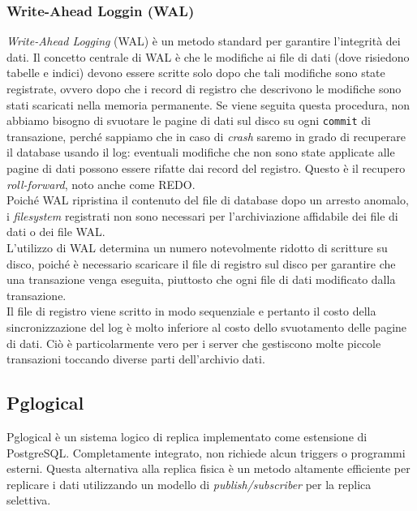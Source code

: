 \item
\subsubsection{Write-Ahead Loggin (WAL)}
\textit{Write-Ahead Logging} (WAL) \`{e} un metodo standard per garantire l'integrit\`{a} dei dati. Il concetto centrale di WAL \`{e} che le modifiche ai file di dati (dove risiedono tabelle e indici) devono essere scritte solo dopo che tali modifiche sono state registrate, ovvero dopo che i record di registro che descrivono le modifiche sono stati scaricati nella memoria permanente. Se viene seguita questa procedura, non abbiamo bisogno di svuotare le pagine di dati sul disco su ogni \verb"commit" di transazione, perch\'{e} sappiamo che in caso di \textit{crash} saremo in grado di recuperare il database usando il log: eventuali modifiche che non sono state applicate alle pagine di dati possono essere rifatte dai record del registro. Questo \`{e} il recupero \textit{roll-forward}, noto anche come REDO.\\

Poich\'{e} WAL ripristina il contenuto del file di database dopo un arresto anomalo, i \textit{filesystem} registrati non sono necessari per l'archiviazione affidabile dei file di dati o dei file WAL. \\
L'utilizzo di WAL determina un numero notevolmente ridotto di scritture su disco, poich\'{e} \`{e} necessario scaricare il file di registro sul disco per garantire che una transazione venga eseguita, piuttosto che ogni file di dati modificato dalla transazione. \\
Il file di registro viene scritto in modo sequenziale e pertanto il costo della sincronizzazione del log \`{e} molto inferiore al costo dello svuotamento delle pagine di dati. Ci\`{o} \`{e} particolarmente vero per i server che gestiscono molte piccole transazioni toccando diverse parti dell'archivio dati\cite{etichetta15}.
 
\item
\subsection{Pglogical}
Pglogical \`{e} un sistema logico di replica implementato come estensione di PostgreSQL. Completamente integrato, non richiede alcun triggers o programmi esterni. Questa alternativa alla replica fisica \`{e} un metodo altamente efficiente per replicare i dati utilizzando un modello di \textit{publish/subscriber} per la replica selettiva\cite{etichetta3}.


